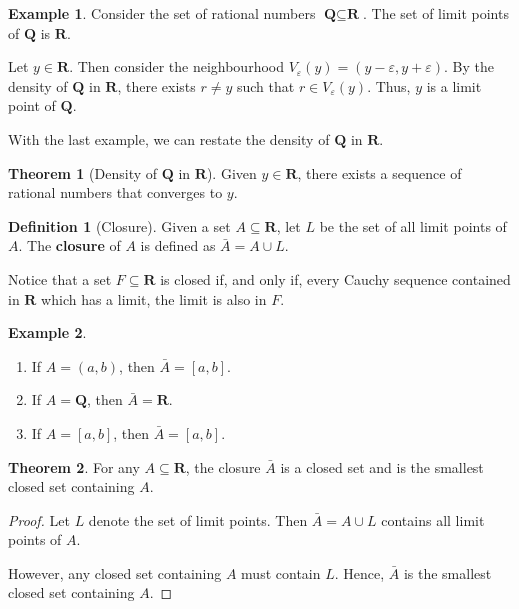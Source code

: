 \documentclass[tikz,12pt,a4paper]{article}
\theoremstyle{definition}
\newtheorem{theorem}{Theorem}[section]
\newtheorem{example}{Example}[section]
\newtheorem{definition}{Definition}[section]
\begin{document}
\begin{example}
	Consider the set of rational numbers $\textbf{Q} \subseteq \textbf{R}$. The set of limit points of $\textbf{Q}$ is $\textbf{R}$.
	
	Let $y \in \textbf{R}$. Then consider the neighbourhood $V_{\varepsilon}(y) = (y - \varepsilon, y + \varepsilon)$. By the density of $\textbf{Q}$ in $\textbf{R}$, there exists $r \neq y$ such that $r \in V_{\varepsilon}(y)$. Thus, $y$ is a limit point of $\textbf{Q}$.
\end{example}

With the last example, we can restate the density of $\textbf{Q}$ in $\textbf{R}$.

\begin{theorem}[Density of $\textbf{Q}$ in $\textbf{R}$]
	Given $y \in \textbf{R}$, there exists a sequence of rational numbers that converges to $y$. 
\end{theorem}

\begin{definition}[Closure]
	Given a set $A \subseteq \textbf{R}$, let $L$ be the set of all limit points of $A$. The \textbf{closure} of $A$ is defined as $\bar{A} = A \cup L$.
\end{definition}

Notice that a set $F \subseteq \textbf{R}$ is closed if, and only if, every Cauchy sequence contained in $\textbf{R}$ which has a limit, the limit is also in $F$.

\begin{example}
	\begin{enumerate}
		\item If $A = (a,b)$, then $\bar{A} = [a,b]$.
		\item If $A = \textbf{Q}$, then $\bar{A} = \textbf{R}$.
		\item If $A = [a,b]$, then $\bar{A} = [a,b]$.
	\end{enumerate}
\end{example}

\begin{theorem}
	For any $A \subseteq \textbf{R}$, the closure $\bar{A}$ is a closed set and is the smallest closed set containing $A$.
\end{theorem}

\begin{proof}
	Let $L$ denote the set of limit points. Then $\bar{A} = A \cup L$ contains all limit points of $A$.
	
	However, any closed set containing $A$ must contain $L$. Hence, $\bar{A}$ is the smallest closed set containing $A$.
\end{proof}
\end{document}
